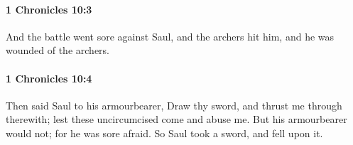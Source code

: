 		\paragraph{1 Chronicles 10:3} %
			\label{1CHRONICLES-10-3}

			And the battle went sore against Saul, and the archers hit him, and he was wounded of the archers.


		\paragraph{1 Chronicles 10:4} %
			\label{1CHRONICLES-10-4}

			Then said Saul to his armourbearer, Draw thy sword, and thrust me through therewith; lest these uncircumcised come and abuse me. But his armourbearer would not; for he was sore afraid. So Saul took a sword, and fell upon it.


